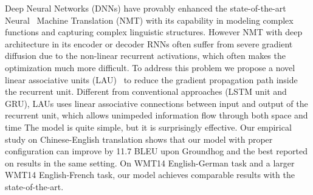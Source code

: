 Deep Neural Networks (DNNs) have provably enhanced the state-of-the-art Neural  Machine Translation (NMT) with its capability in modeling complex functions and capturing complex linguistic structures. However NMT with deep architecture in its encoder or decoder RNNs often suffer from severe gradient diffusion due to the non-linear recurrent activations, which often makes the optimization much more difficult. To address this problem we propose a novel linear associative units (LAU)  to reduce the gradient propagation path inside the recurrent unit. Different from conventional approaches (LSTM unit and GRU), LAUs uses linear associative connections between input and output of the recurrent unit, which allows unimpeded information flow through both space and time  The model is quite simple, but it is surprisingly effective. Our empirical study on Chinese-English translation shows that our model with proper configuration can improve by 11.7 BLEU upon Groundhog and the best reported on results in the same setting. On WMT14 English-German task and a larger WMT14 English-French task, our model achieves comparable results with the state-of-the-art.
